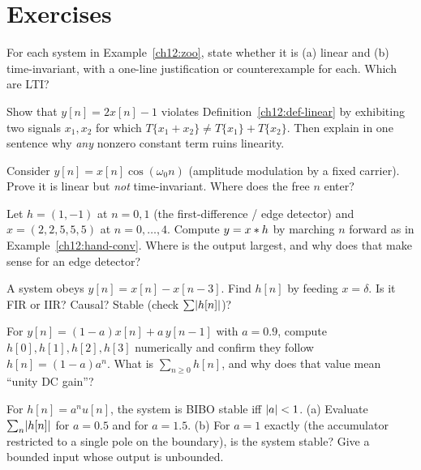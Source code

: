 \section{Exercises}
\label{ch12:exercises}

\begin{exercise}
For each system in Example~\ref{ch12:zoo}, state whether it is (a) linear and
(b) time-invariant, with a one-line justification or counterexample for each.
Which are LTI?
\end{exercise}

\begin{exercise}
Show that $y[n]=2x[n]-1$ violates Definition~\ref{ch12:def-linear} by exhibiting
two signals $x_1,x_2$ for which $T\{x_1+x_2\}\ne T\{x_1\}+T\{x_2\}$. Then explain
in one sentence why \emph{any} nonzero constant term ruins linearity.
\end{exercise}

\begin{exercise}
Consider $y[n]=x[n]\cos(\omega_0 n)$ (amplitude modulation by a fixed carrier).
Prove it is linear but \emph{not} time-invariant. Where does the free $n$ enter?
\end{exercise}

\begin{exercise}
Let $h=(1,-1)$ at $n=0,1$ (the first-difference / edge detector) and
$x=(2,2,5,5,5)$ at $n=0,\dots,4$. Compute $y=x\ast h$ by marching $n$ forward
as in Example~\ref{ch12:hand-conv}. Where is the output largest, and why does
that make sense for an edge detector?
\end{exercise}

\begin{exercise}
A system obeys $y[n]=x[n]-x[n-3]$. Find $h[n]$ by feeding $x=\delta$. Is it FIR
or IIR? Causal? Stable (check $\sum\lvert h[n]\rvert$)?
\end{exercise}

\begin{exercise}
For $y[n]=(1-a)x[n]+a\,y[n-1]$ with $a=0.9$, compute $h[0],h[1],h[2],h[3]$
numerically and confirm they follow $h[n]=(1-a)a^n$. What is $\sum_{n\ge0}h[n]$,
and why does that value mean ``unity DC gain''?
\end{exercise}

\begin{exercise}
For $h[n]=a^n u[n]$, the system is BIBO stable iff $\lvert a\rvert<1$. (a) Evaluate
$\sum_n\lvert h[n]\rvert$ for $a=0.5$ and for $a=1.5$. (b) For $a=1$ exactly (the
accumulator restricted to a single pole on the boundary), is the system stable?
Give a bounded input whose output is unbounded.
\end{exercise}

